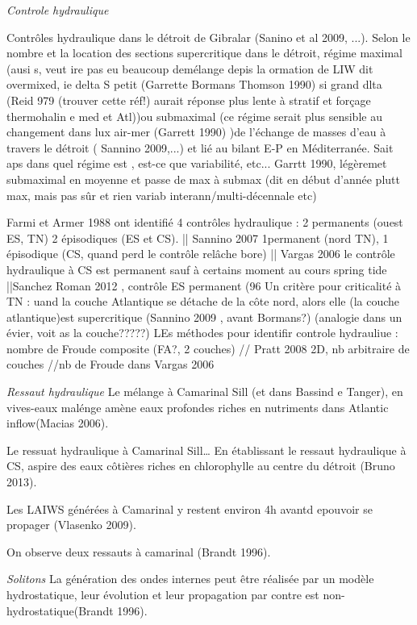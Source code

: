 \textit{Controle hydraulique}

Contrôles hydraulique dans le détroit de Gibralar (Sanino et al 2009, ...). Selon le nombre et la location des sections supercritique dans le détroit, régime maximal (ausi s, veut ire pas eu beaucoup demélange depis la ormation de LIW dit overmixed, ie delta S petit (Garrette Bormans Thomson 1990) si grand dlta (Reid 979 (trouver cette réf!) aurait réponse plus lente à stratif et forçage thermohalin e med et Atl))ou submaximal (ce régime serait plus sensible au changement dans lux air-mer (Garrett 1990) )de l'échange de masses d'eau à travers le détroit ( Sannino 2009,...) et lié au bilant E-P en Méditerranée. Sait aps dans quel régime est , est-ce que variabilité, etc... Garrtt 1990, légèremet submaximal en moyenne et passe de max à submax (dit en début d'année plutt max, mais pas sûr et rien variab interann/multi-décennale etc)

Farmi et Armer 1988 ont identifié 4 contrôles hydraulique : 2 permanents (ouest ES, TN) 2 épisodiques (ES et CS). || Sannino 2007 1permanent (nord TN), 1 épisodique (CS, quand perd le contrôle relâche bore) || Vargas 2006 le contrôle hydraulique à CS est permanent sauf à certains moment au cours spring tide ||Sanchez Roman 2012 , contrôle ES permanent (96%
Un critère pour criticalité à TN : uand la couche Atlantique se détache de la côte nord, alors elle (la couche atlantique)est supercritique (Sannino 2009 , avant Bormans?) (analogie dans un évier, voit as la couche?????)
LEs méthodes pour identifir controle hydrauliue : nombre de Froude composite (FA?, 2 couches) // Pratt 2008 2D, nb arbitraire de couches //nb de Froude dans Vargas 2006

\textit{Ressaut hydraulique}
Le mélange à Camarinal Sill (et dans Bassind e Tanger), en vives-eaux malénge amène eaux profondes riches en nutriments dans Atlantic inflow(Macias 2006).

Le ressuat hydraulique à Camarinal Sill… En établissant le ressaut hydraulique à CS, aspire des eaux côtières riches en chlorophylle au centre du détroit (Bruno 2013).

Les LAIWS générées à Camarinal y restent environ 4h avantd epouvoir se propager (Vlasenko 2009).

On observe deux ressauts à camarinal (Brandt 1996).

\textit{Solitons}
La génération des ondes internes peut être réalisée par un modèle hydrostatique, leur évolution et leur propagation par contre est non-hydrostatique(Brandt 1996).

